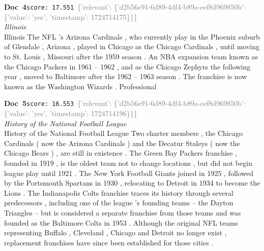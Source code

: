\documentclass[a4paper,11pt]{article}
\begin{document}
\begin{docenv}
{\footnotesize\textcolor{doccolor}{\textbf{Doc~4}}}\hfill{\tiny\texttt{score:~17.551}}\ {\tiny\textcolor{gray}{\{'relevant': \{'d2b56e91-6d89-4df4-b89a-eef8d969850b': \{'value': 'yes', 'timestamp': 1724714175\}\}\}}}\\[3pt]
{\small\textit{Illinois}}\\[2pt]
\vspace{2pt}
{\footnotesize Illinois
The NFL 's Arizona Cardinals , who currently play in the Phoenix suburb of Glendale , Arizona , played in Chicago as the Chicago Cardinals , until moving to St. Louis , Missouri after the 1959 season . An NBA expansion team known as the Chicago Packers in 1961 -- 1962 , and as the Chicago Zephyrs the following year , moved to Baltimore after the 1962 -- 1963 season . The franchise is now known as the Washington Wizards . Professional}
\end{docenv}
\begin{docenv}
{\footnotesize\textcolor{doccolor}{\textbf{Doc~5}}}\hfill{\tiny\texttt{score:~16.553}}\ {\tiny\textcolor{gray}{\{'relevant': \{'d2b56e91-6d89-4df4-b89a-eef8d969850b': \{'value': 'yes', 'timestamp': 1724714196\}\}\}}}\\[3pt]
{\small\textit{History of the National Football League}}\\[2pt]
\vspace{2pt}
{\footnotesize History of the National Football League
Two charter members , the Chicago Cardinals ( now the Arizona Cardinals ) and the Decatur Staleys ( now the Chicago Bears ) , are still in existence . The Green Bay Packers franchise , founded in 1919 , is the oldest team not to change locations , but did not begin league play until 1921 . The New York Football Giants joined in 1925 , followed by the Portsmouth Spartans in 1930 , relocating to Detroit in 1934 to become the Lions . The Indianapolis Colts franchise traces its history through several predecessors , including one of the league 's founding teams -- the Dayton Triangles -- but is considered a separate franchise from those teams and was founded as the Baltimore Colts in 1953 . Although the original NFL teams representing Buffalo , Cleveland , Chicago and Detroit no longer exist , replacement franchises have since been established for those cities .}
\end{docenv}
\end{document}
